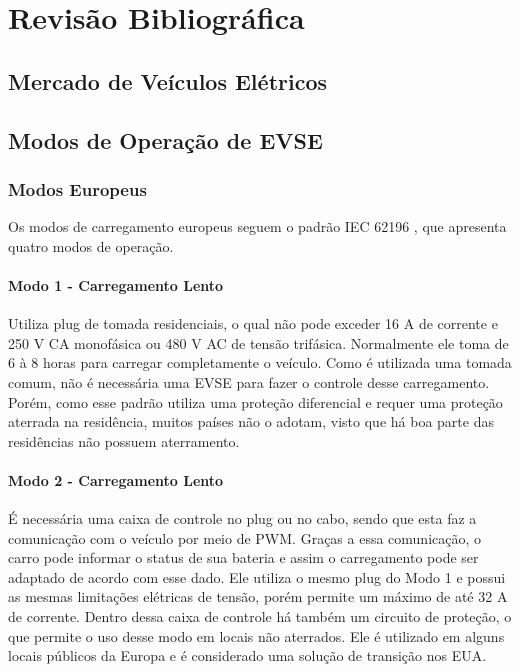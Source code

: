 \chapter{Revisão Bibliográfica}

  \section{Mercado de Veículos Elétricos}

  \section{Modos de Operação de \ac{EVSE}}

    \subsection{Modos Europeus}

      Os modos de carregamento europeus seguem o padrão IEC 62196 \cite{iec-62196}, que apresenta quatro modos de operação.

        \subsubsection{Modo 1 - Carregamento Lento}

        Utiliza plug de tomada residenciais, o qual não pode exceder 16 A de corrente e 250 V \ac{CA} monofásica ou 480 V AC de tensão trifásica. Normalmente ele toma de 6 à 8 horas para carregar completamente o veículo. Como é utilizada uma tomada comum, não é necessária uma \ac{EVSE} para fazer o controle desse carregamento. Porém, como esse padrão utiliza uma proteção diferencial e requer uma proteção aterrada na residência, muitos países não o adotam, visto que há boa parte das residências não possuem aterramento.

        \subsubsection{Modo 2 - Carregamento Lento}

        É necessária uma caixa de controle no plug ou no cabo, sendo que esta faz a comunicação com o veículo por meio de \ac{PWM}. Graças a essa comunicação, o carro pode informar o status de sua bateria e assim o carregamento pode ser adaptado de acordo com esse dado. Ele utiliza o mesmo plug do Modo 1 e possui as mesmas limitações elétricas de tensão, porém permite um máximo de até 32 A de corrente. Dentro dessa caixa de controle há também um circuito de proteção, o que permite o uso desse modo em locais não aterrados. Ele é utilizado em alguns locais públicos da Europa e é considerado uma solução de transição nos EUA.

